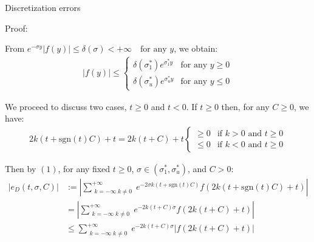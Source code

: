 \documentclass{beamer}
\begin{document}
\begin{frame}{Discretization errors}


    {\footnotesize \scriptsize
    \par Proof:
    \par From $ e^{-\sigma y} |f(y)| \leq \delta(\sigma) < +\infty \quad \text{for any } y$, we obtain:
    \begin{align*}
        |f(y)| \leq 
        \begin{cases} 
        \delta(\sigma_{1}^{*})e^{\sigma_{1}^{*}y} & \text{for any } y \geq 0 \\
        \delta(\sigma_{u}^{*})e^{\sigma_{u}^{*}y} & \text{for any } y \leq 0 \tag{1}
        \end{cases}
    \end{align*}
    \par We proceed to discuss two cases, \( t \geq 0 \) and \( t < 0 \). If \( t \geq 0 \) then, for any \( C \geq 0 \), we have:
    \begin{align*}
        2k(t + \text{sgn}(t)C) + t = 2k(t + C) + t 
        \begin{cases} 
        \geq 0 & \text{if } k > 0 \text{ and } t \geq 0 \\
        \leq 0 & \text{if } k < 0 \text{ and } t \geq 0
        \end{cases}
    \end{align*}
    \par Then by $(1)$, for any fixed \( t \geq 0 \), \( \sigma \in (\sigma_{1}^{*}, \sigma_{u}^{*}) \), and \( C > 0 \):
    \begin{align*}
          \left| e_D(t, \sigma, C) \right| & := \left| \sum_{\substack{k=-\infty \; k \neq 0}}^{+\infty} e^{-2\sigma k (t + \text{sgn}(t)C)} f(2k(t + \text{sgn}(t)C) + t)\right|\\
           & = \left| \sum_{\substack{k=-\infty \; k \neq 0}}^{+\infty}  e^{-2k(t+C)\sigma} f(2k(t + C) + t) \right|\\
           & \leq \sum_{\substack{k=-\infty \; k \neq 0}}^{+\infty}  e^{-2k(t+C)\sigma} |f(2k(t + C) + t)|
    \end{align*}
    
    }
    
\end{frame}
\end{document}

